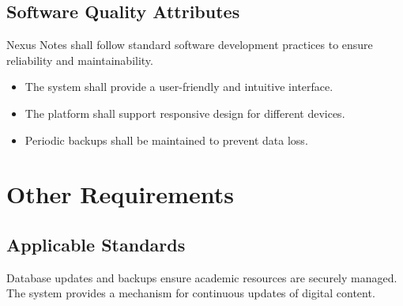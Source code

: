 \documentclass[12pt]{article}
\begin{document}
\subsection{Software Quality Attributes}
Nexus Notes shall follow standard software development practices to ensure reliability and maintainability.

\begin{itemize}
    \item The system shall provide a user-friendly and intuitive interface.
    \item The platform shall support responsive design for different devices.
    \item Periodic backups shall be maintained to prevent data loss.
\end{itemize}
\section{Other Requirements}

\subsection{Applicable Standards}
Database updates and backups ensure academic resources are securely managed.
The system provides a mechanism for continuous updates of digital content.
\end{document}
